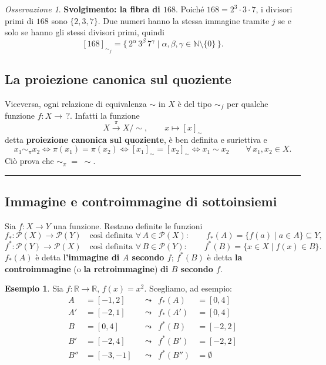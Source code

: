 \documentclass[11pt,a4paper]{article}
\newcommand{\N}{\mathbb{N}}
\newcommand{\R}{\mathbb{R}}
\newcommand{\Pot}{\mathcal{P}}
\theoremstyle{definition}
\newtheorem{esempio}[definizione]{Esempio}
\theoremstyle{plain}
\theoremstyle{remark}
\newtheorem*{osservazione}{Osservazione}
\begin{document}
\begin{osservazione}
\textbf{Svolgimento: la fibra di $168$}. 
Poich\'e $168=2^3\cdot3\cdot7$, i divisori primi di $168$ sono $\{2,3,7\}$. Due numeri hanno la stessa immagine tramite $j$ se e solo se hanno gli stessi divisori primi, quindi
\[
[168]_{\sim_j}=\{\,2^\alpha\,3^\beta\,7^\gamma\mid\alpha,\beta,\gamma\in\N\setminus\{0\}\,\}.
\]
\end{osservazione}

\subsection{La proiezione canonica sul quoziente}

Viceversa, ogni relazione di equivalenza $\sim$ in $X$ \`e del tipo $\sim_f$ per qualche funzione $f\colon X\to\,?$. Infatti la funzione
\[
X\xrightarrow{\ \pi\ }X/{\sim},\qquad x\longmapsto[x]_\sim
\]
detta \textbf{proiezione canonica sul quoziente}, \`e ben definita e suriettiva e
\[
x_1\sim_\pi x_2\iff\pi(x_1)=\pi(x_2)\iff[x_1]_\sim=[x_2]_\sim\iff x_1\sim x_2\qquad\forall\,x_1,x_2\in X .
\]
Ci\`o prova che $\sim_\pi\;=\;\sim$.

\bigskip\hrule\bigskip

\subsection{Immagine e controimmagine di sottoinsiemi}

Sia $f\colon X\to Y$ una funzione. Restano definite le funzioni
\[
f_*\colon\Pot(X)\to\Pot(Y)\quad\text{cos\`i definita }\forall\,A\in\Pot(X):\qquad f_*(A)=\{f(a)\mid a\in A\}\subseteq Y,
\]
\[
f^*\colon\Pot(Y)\to\Pot(X)\quad\text{cos\`i definita }\forall\,B\in\Pot(Y):\qquad f^*(B)=\{x\in X\mid f(x)\in B\}.
\]
$f_*(A)$ \`e detta \textbf{l'immagine di $A$ secondo $f$}; $f^*(B)$ \`e detta \textbf{la controimmagine} (o \textbf{la retroimmagine}) \textbf{di $B$ secondo $f$}.

\begin{esempio}
Sia $f\colon\R\to\R$, $f(x)=x^2$. Scegliamo, ad esempio:
\begin{align*}
A&=[-1,2]&&\leadsto&f_*(A)&=[0,4]\\
A'&=[-2,1]&&\leadsto&f_*(A')&=[0,4]\\
B&=[0,4]&&\leadsto&f^*(B)&=[-2,2]\\
B'&=[-2,4]&&\leadsto&f^*(B')&=[-2,2]\\
B''&=[-3,-1]&&\leadsto&f^*(B'')&=\emptyset
\end{align*}
\end{esempio}
\end{document}
